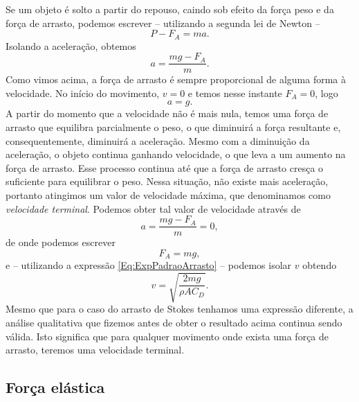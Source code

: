 Se um objeto é solto a partir do repouso, caindo sob efeito da força peso e da força de arrasto, podemos escrever -- utilizando a segunda lei de Newton --
\begin{equation}
  P - F_A = ma.
\end{equation}
%
Isolando a aceleração, obtemos
\begin{equation}
  a = \frac{mg - F_A}{m}.
\end{equation}
%
Como vimos acima, a força de arrasto é sempre proporcional de alguma forma à velocidade. No início do movimento, $v = 0$ e temos nesse instante $F_A = 0$, logo
\begin{equation}
  a = g.
\end{equation}
%
A partir do momento que a velocidade não é mais nula, temos uma força de arrasto que equilibra parcialmente o peso, o que diminuirá a força resultante e, consequentemente, diminuirá a aceleração. Mesmo com a diminuição da aceleração, o objeto continua ganhando velocidade, o que leva a um aumento na força de arrasto. Esse processo continua até que a força de arrasto cresça o suficiente para equilibrar o peso. Nessa situação, não existe mais aceleração, portanto atingimos um valor de velocidade máxima, que denominamos como \emph{velocidade terminal}. Podemos obter tal valor de velocidade através de
\begin{equation}
  a = \frac{mg - F_A}{m} = 0,
\end{equation}
%
de onde podemos escrever
\begin{equation}
  F_A = mg,
\end{equation}
%
e -- utilizando a expressão \eqref{Eq:ExpPadraoArrasto} -- podemos isolar $v$ obtendo
\begin{equation}
  v = \sqrt{\frac{2mg}{\rho A C_D}}.
\end{equation}
%
Mesmo que para o caso do arrasto de Stokes tenhamos uma expressão diferente, a análise qualitativa que fizemos antes de obter o resultado acima continua sendo válida. Isto significa que para qualquer movimento onde exista uma força de arrasto, teremos uma velocidade terminal.

\subsection{Força elástica}

